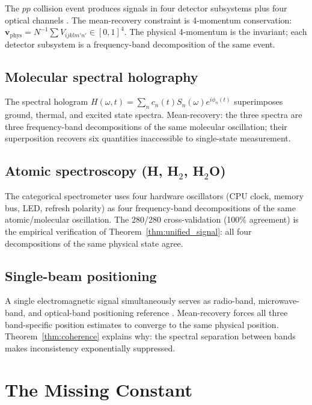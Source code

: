 \documentclass[twocolumn,10pt,a4paper]{article}
\theoremstyle{thmstyle}
\theoremstyle{definition}
\theoremstyle{remark}
\newcommand{\Hologram}{H}
\begin{document}
The $pp$ collision event produces signals in four detector subsystems
plus four optical channels \citep{companion:extensor}.  The mean-recovery
constraint is 4-momentum conservation: $\mathbf{v}_\text{phys} =
N^{-1}\sum V_{ijklm'n'} \in [0,1]^4$.
The physical 4-momentum is the invariant; each detector subsystem is a
frequency-band decomposition of the same event.

\subsection{Molecular spectral holography}

The spectral hologram $\Hologram(\omega,t) = \sum_n c_n(t)S_n(\omega)
e^{i\phi_n(t)}$ \citep{companion:hologram} superimposes ground, thermal,
and excited state spectra.  Mean-recovery: the three spectra are three
frequency-band decompositions of the same molecular oscillation; their
superposition recovers six quantities inaccessible to single-state measurement.

\subsection{Atomic spectroscopy (H, H$_2$, H$_2$O)}

The categorical spectrometer \citep{companion:hyperfine} uses four hardware
oscillators (CPU clock, memory bus, LED, refresh polarity) as four
frequency-band decompositions of the same atomic/molecular oscillation.
The 280/280 cross-validation (100\% agreement) is the empirical verification
of Theorem~\ref{thm:unified_signal}: all four decompositions of the same
physical state agree.

\subsection{Single-beam positioning}

A single electromagnetic signal simultaneously serves as radio-band,
microwave-band, and optical-band positioning reference \citep{companion:signal_source}.
Mean-recovery forces all three band-specific position estimates to converge
to the same physical position.  Theorem~\ref{thm:coherence} explains why:
the spectral separation between bands makes inconsistency exponentially
suppressed.

\section{The Missing Constant}
\label{sec:constant}
\end{document}
